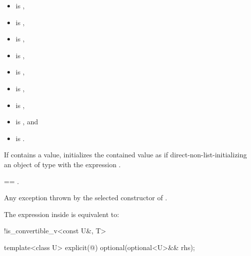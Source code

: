 \begin{itemdescr}
\pnum
\constraints
\begin{itemize}
\item {} is ,
\item {} is ,
\item {} is ,
\item {} is ,
\item {} is ,
\item {} is ,
\item {} is ,
\item {} is , and
\item {} is .
\end{itemize}

\pnum
\effects
If  contains a value,
initializes the contained value as if direct-non-list-initializing
an object of type  with the expression .

\pnum
\ensures
{} == .

\pnum
\throws
Any exception thrown by the selected constructor of .

\pnum
\remarks
The expression inside  is equivalent to:
\begin{codeblock}
!is_convertible_v<const U&, T>
\end{codeblock}
\end{itemdescr}

%
\begin{itemdecl}
template<class U> explicit(@\seebelow@) optional(optional<U>&& rhs);
\end{itemdecl}


